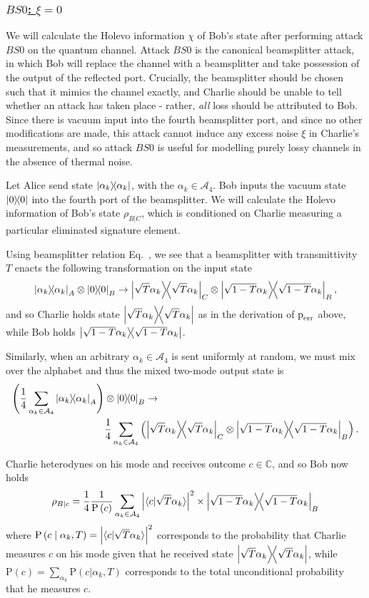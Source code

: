 \subsubsection{\underline{$BS0$: $\xi = 0$}}
We will calculate the Holevo information $\chi$ of Bob's state after performing attack $BS0$ on the quantum channel. Attack $BS0$ is the canonical beamsplitter attack, in which Bob will replace the channel with a beamsplitter and take possession of the output of the reflected port. Crucially, the beamsplitter should be chosen such that it mimics the channel exactly, and Charlie should be unable to tell whether an attack has taken place - rather, \emph{all} loss should be attributed to Bob. Since there is vacuum input into the fourth beamsplitter port, and since no other modifications are made, this attack cannot induce any excess noise $\xi$ in Charlie's measurements, and so attack $BS0$ is useful for modelling purely lossy channels in the absence of thermal noise.

Let Alice send state $\dyad{\alpha_k}$, with the $\alpha_k \in \mathcal{A}_4$. Bob inputs the vacuum state $\dyad{0}$ into the fourth port of the beamsplitter. We will calculate the Holevo information of Bob's state $\rho_{B | C}$, which is conditioned on Charlie measuring a particular eliminated signature element.

Using beamsplitter relation Eq.~, we see that a beamsplitter with transmittivity $T$ enacts the following transformation on the input state
\begin{equation}
\dyad{\alpha_k}_A \otimes \dyad{0}_B \rightarrow \dyad{\sqrt{T} \alpha_k}_C \otimes \dyad{\sqrt{1-T}\alpha_k}_{B},
\end{equation}
and so Charlie holds state $\dyad{\sqrt{T}\alpha_k}$ as in the derivation of $\text{p}_{\text{err}}$ above, while Bob holds $\dyad{\sqrt{1-T}\alpha_k}$.

Similarly, when an arbitrary $\alpha_k \in \mathcal{A}_4$ is sent uniformly at random, we must mix over the alphabet and thus the mixed two-mode output state is
\begin{align}
\left(\frac{1}{4}\sum_{\alpha_k \in \mathcal{A}_4} \dyad{\alpha_k}_A\right) &\otimes \dyad{0}_B \rightarrow \notag \\
&\frac{1}{4}\sum_{\alpha_k \in \mathcal{A}_4} \left(\dyad{\sqrt{T}\alpha_k}_C \otimes \dyad{\sqrt{1-T}\alpha_k}_B\right).
\end{align}

\noindent Charlie heterodynes on his mode and receives outcome $c \in \mathbb{C}$, and so Bob now holds
\begin{equation}
\rho_{B | c} = \frac{1}{4}\frac{1}{\text{P}\left(c\right)}\sum_{\alpha_k \in \mathcal{A}_4} \left| \langle c | \sqrt{T}\alpha_k\rangle \right|^2 \times \dyad{\sqrt{1-T}\alpha_k}_B
\end{equation}
where $\text{P}\left(c \; \middle| \; \alpha_k, T\right) = \left| \langle c | \sqrt{T}\alpha_k\rangle \right|^2$ corresponds to the probability that Charlie measures $c$ on his mode given that he received state $\dyad{\sqrt{T}\alpha_k}$, while $\text{P}\left(c\right) = \sum_{\alpha_k} \text{P}\left(c | \alpha_k, T\right)$ corresponds to the total unconditional probability that he measures $c$.

